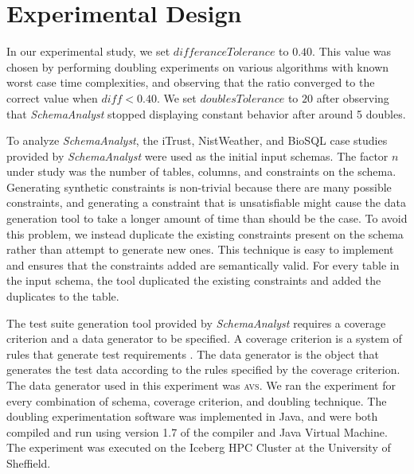 \section{Experimental Design}

In our experimental study, we set $\mathit{differanceTolerance}$ to
$0.40$. This value was chosen by performing doubling
experiments on various algorithms with known worst case time
complexities, and observing that the ratio converged to the correct
value when $\mathit{diff} < 0.40$.
We set $\mathit{doublesTolerance}$ to $20$ after observing that
\textit{SchemaAnalyst} stopped displaying constant behavior after around
5 doubles.

To analyze \textit{SchemaAnalyst}, the iTrust, NistWeather, and BioSQL case
studies provided by \textit{SchemaAnalyst} were used as the initial 
input schemas.
The factor $n$
under study was the number of tables, columns, and constraints on the schema.  
Generating
synthetic constraints is non-trivial because there are many
possible constraints, and generating a constraint that is
unsatisfiable might cause the data generation tool to take a longer
amount of time than should be the case. To avoid this problem, we
instead duplicate the existing constraints present on the schema
rather than attempt to generate new ones. This technique is easy
to implement and ensures that the constraints added are
semantically valid.  For every table in the input schema, the tool 
duplicated the existing constraints and added the duplicates 
to the table.  

The test suite generation tool provided by \textit{SchemaAnalyst}
requires a coverage criterion and a data generator to be specified. A
coverage criterion is a system of rules that generate test requirements
\cite{Ammann:Testing}. The data generator is the object that generates
the test data according to the rules specified by the coverage
criterion.
The data generator used in this experiment was \textsc{avs}. We ran the
experiment for every combination of schema, coverage criterion, and doubling
technique. The
doubling experimentation software was implemented in Java, and were both compiled and run using
version 1.7 of the compiler and Java Virtual Machine. The experiment was
executed on the Iceberg HPC Cluster at the University of Sheffield.
